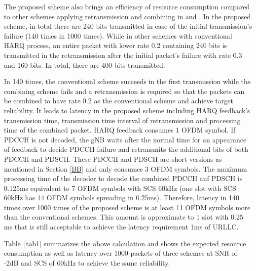 \documentclass[conference,10pt]{IEEEtran}
\begin{document}
The proposed scheme also brings an efficiency of resource consumption compared to other schemes applying retransmission and combining in \cite{b3} and \cite{b4}. In the proposed scheme, in total there are 240 bits transmitted in case of the initial transmission's failure (140 times in 1000 times). While in other schemes with conventional HARQ process, an entire packet with lower rate 0.2 containing 240 bits is transmitted in the retransmission after the initial packet's failure with rate 0.3 and 160 bits. In total, there are 400 bits transmitted.

In 140 times, the conventional scheme succeeds in the first transmission while the combining scheme fails and a retransmission is required so that the packets can be combined to have rate 0.2 as the conventional scheme and achieve target reliability. It leads to latency in the proposed scheme including HARQ feedback's transmission time, transmission time interval of retransmission and processing time of the combined packet. HARQ feedback consumes 1 OFDM symbol. If PDCCH is not decoded, the gNB waits after the normal time for an appearance of feedback to decide PDCCH failure and retransmits the additional bits of both PDCCH and PDSCH. These PDCCH and PDSCH are short versions as mentioned in Section \ref{BB} and only consumes 3 OFDM symbols. The maximum processing time of the decoder to decode the combined PDCCH anf PDSCH is 0.125ms equivalent to 7 OFDM symbols with SCS 60kHz (one slot with SCS 60kHz has 14 OFDM symbols spreading in 0.25ms). Therefore, latency in 140 times over 1000 times of the proposed scheme is at least 11 OFDM symbols more than the conventional schemes. This amount is approximate to 1 slot with 0.25 ms that is still acceptable to achieve the latency requirement 1ms of URLLC.

Table~\ref{tab1} summarizes the above calculation and shows the expected resource consumption as well as latency over 1000 packets of three schemes at SNR of -2dB and SCS of 60kHz to achieve the same reliability.
\end{document}
